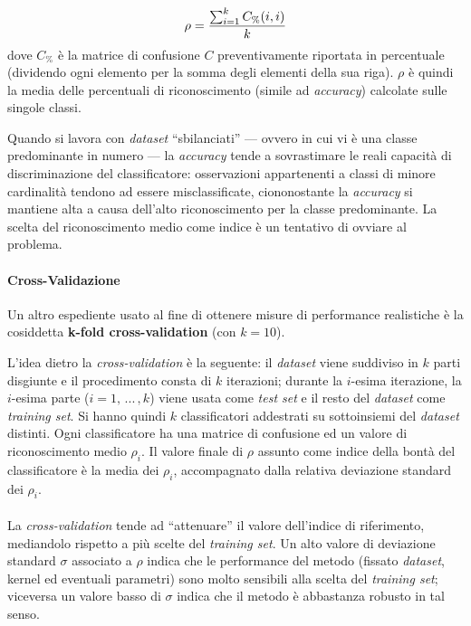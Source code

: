 \begin{equation}
	\rho = \frac{\sum_{i=1}^{k}{C_\%(i, i)}}{k}	
	\vspace{2mm}
\end{equation}
dove $C_\%$ è la matrice di confusione $C$ preventivamente riportata in percentuale (dividendo ogni elemento per la somma degli elementi della sua riga).
$\rho$ è quindi la media delle percentuali di riconoscimento (simile ad \textit{accuracy}) calcolate sulle singole classi.

Quando si lavora con \textit{dataset} ``sbilanciati'' --- ovvero in cui vi è una classe predominante in numero --- la \textit{accuracy} tende a sovrastimare le reali capacità di discriminazione del classificatore: osservazioni appartenenti a classi di minore cardinalità tendono ad essere misclassificate, ciononostante la \textit{accuracy} si mantiene alta a causa dell'alto riconoscimento per la classe predominante. La scelta del riconoscimento medio come indice è un tentativo di ovviare al problema.

\paragraph{Cross-Validazione}
Un altro espediente usato al fine di ottenere misure di performance realistiche è la cosiddetta \textbf{k-fold cross-validation} (con $k = 10$).

L'idea dietro la \textit{cross-validation} è la seguente: il \textit{dataset} viene suddiviso in $k$ parti disgiunte e il procedimento consta di $k$ iterazioni; durante la $i$-esima iterazione, la $i$-esima parte ($i = 1, \, ... \, , k$) viene usata come \textit{test set} e il resto del \textit{dataset} come \textit{training set}. Si hanno quindi $k$ classificatori addestrati su sottoinsiemi del \textit{dataset} distinti. Ogni classificatore ha una matrice di confusione ed un valore di riconoscimento medio $\rho_i$.
Il valore finale di $\rho$ assunto come indice della bontà del classificatore è la media dei $\rho_i$, accompagnato dalla relativa deviazione standard dei $\rho_i$. 

\paragraph{}
La \textit{cross-validation} tende ad ``attenuare'' il valore dell'indice di riferimento, mediandolo rispetto a più scelte del \textit{training set}. Un alto valore di deviazione standard $\sigma$ associato a $\rho$ indica che le performance del metodo (fissato \textit{dataset}, kernel ed eventuali parametri) sono molto sensibili alla scelta del \textit{training set}; viceversa un valore basso di $\sigma$ indica che il metodo è abbastanza robusto in tal senso.

